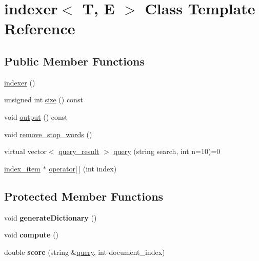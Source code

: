 \hypertarget{classindexer}{}\section{indexer$<$ T, E $>$ Class Template Reference}
\label{classindexer}
\subsection*{Public Member Functions}
\begin{DoxyCompactItemize}
\item 
\hyperlink{classindexer_acec32e69288ecb53d04672ce28cb6f25}{indexer} ()
\item 
unsigned int \hyperlink{classindexer_af54a50fbe5e93e780394d6fede3d2039}{size} () const
\item 
void \hyperlink{classindexer_a57326049d8cbb3ca7572b9b2e8cfcd87}{output} () const
\item 
void \hyperlink{classindexer_aad6e8ddbe8103aa48965f3a4f7aea2c0}{remove\+\_\+stop\+\_\+words} ()
\item 
virtual vector$<$ \hyperlink{classquery__result}{query\+\_\+result} $>$ \hyperlink{classindexer_a9a7679edcc3114613dac13b688c0e4b2}{query} (string search, int n=10)=0
\item 
\hyperlink{classindex__item}{index\+\_\+item} $\ast$ \hyperlink{classindexer_a44e2cc6e93dc86ea24a8406c041250be}{operator\mbox{[}$\,$\mbox{]}} (int index)
\end{DoxyCompactItemize}
\subsection*{Protected Member Functions}
\begin{DoxyCompactItemize}
\item 
\mbox{\label{classindexer_a75341ee2b25951ea575e7fbeda55c758}} 
void {\bfseries generate\+Dictionary} ()
\item 
\mbox{\label{classindexer_a0eadc9d111de0ce70b9f1178c6f3c6b5}} 
void {\bfseries compute} ()
\item 
\mbox{\label{classindexer_a879c98d9fda7792df0ae80a0be3b5a4c}} 
double {\bfseries score} (string \&\hyperlink{classindexer_a9a7679edcc3114613dac13b688c0e4b2}{query}, int document\+\_\+index)
\end{DoxyCompactItemize}
